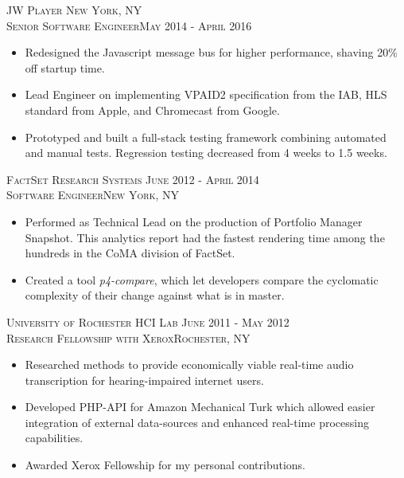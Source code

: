 \documentclass[oneside, final]{scrartcl}
\begin{document}
\begin{center}
\textsc{JW Player \hfill New York, NY\\}
\textsc{Senior Software Engineer\hfill May 2014 - April 2016\\}
\begin{itemize}
    \vspace{-8pt}
	\setlength{\itemsep}{1pt}
	\setlength{\itemsep}{1pt}
	\setlength{\parskip}{0pt}
	\setlength{\parsep}{0pt}
	\setlength{\leftmargin}{-5mm}
	\item Redesigned the Javascript message bus for higher performance, shaving 20\% off startup time.
	\item Lead Engineer on implementing VPAID2 specification from the IAB, HLS standard from Apple, and Chromecast from Google.
	\item Prototyped and built a full-stack testing framework combining automated and manual tests. Regression testing decreased from 4 weeks to 1.5 weeks.
\end{itemize}

\textsc{FactSet Research Systems \hfill June 2012 - April 2014\\}
\textsc{Software Engineer\hfill New York, NY\\}
\begin{itemize}
    \vspace{-8pt}
	\setlength{\itemsep}{1pt}
	\setlength{\parskip}{0pt}
	\setlength{\parsep}{0pt}
	\setlength{\leftmargin}{-5mm}
	\item Performed as Technical Lead on the production of Portfolio Manager Snapshot. This analytics report had the fastest rendering time among the hundreds in the CoMA division of FactSet.
	\item Created a tool \textit{p4-compare}, which let developers compare the cyclomatic complexity of their change against what is in master.
\end{itemize}


\textsc{University of Rochester HCI Lab \hfill June 2011 - May 2012\\}
\textsc{Research Fellowship with Xerox\hfill Rochester, NY\\}
\begin{itemize}
  \vspace{-8pt}
  \setlength{\itemsep}{1pt}
  \setlength{\parskip}{0pt}
  \setlength{\parsep}{0pt}
  \setlength{\leftmargin}{-5mm}
  \item Researched methods to provide economically viable real-time audio transcription for hearing-impaired internet users. 
  \item Developed PHP-API for Amazon Mechanical Turk which allowed easier integration of external data-sources and enhanced real-time processing capabilities.
    \item Awarded Xerox Fellowship for my personal contributions.


\end{itemize}
\end{center}
\end{document}
